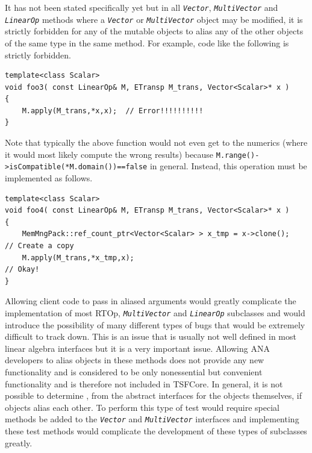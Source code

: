 It has not been stated specifically yet but in all
\texttt{\textit{Vector}}, \texttt{\textit{Multi\-Vector}} and
\texttt{\textit{LinearOp}} methods where a \texttt{\textit{Vector}} or
\texttt{\textit{Multi\-Vector}} object may be modified, it is strictly
forbidden for any of the mutable objects to alias any of the other
objects of the same type in the same method.  For example, code like the
following is strictly forbidden.

{\tiny\begin{verbatim}
template<class Scalar>
void foo3( const LinearOp& M, ETransp M_trans, Vector<Scalar>* x )
{
    M.apply(M_trans,*x,x);  // Error!!!!!!!!!!
}
\end{verbatim}}

Note that typically the above function would not even get to the numerics
(where it would most likely compute the wrong results) because
\texttt{M.range()->isCompatible(*M.domain())==false} in general.
Instead, this operation must be implemented as follows.

{\tiny\begin{verbatim}
template<class Scalar>
void foo4( const LinearOp& M, ETransp M_trans, Vector<Scalar>* x )
{
    MemMngPack::ref_count_ptr<Vector<Scalar> > x_tmp = x->clone();   // Create a copy
    M.apply(M_trans,*x_tmp,x);                                       // Okay!
}
\end{verbatim}}

Allowing client code to pass in aliased arguments would greatly
complicate the implementation of most RTOp,
\texttt{\textit{Multi\-Vector}} and \texttt{\textit{LinearOp}}
subclasses and would introduce the possibility of many different types
of bugs that would be extremely difficult to track down.  This is an
issue that is usually not well defined in most linear algebra
interfaces but it is a very important issue.  Allowing ANA developers
to alias objects in these methods does not provide any new
functionality and is considered to be only nonessential but convenient
functionality and is therefore not included in TSFCore.  In general,
it is not possible to determine , from the abstract interfaces for the
objects themselves, if objects alias each other.  To perform this type
of test would require special methods be added to the
\texttt{\textit{Vector}} and
\texttt{\textit{Multi\-Vector}} interfaces and implementing these test
methods would complicate the development of these types of subclasses
greatly.

